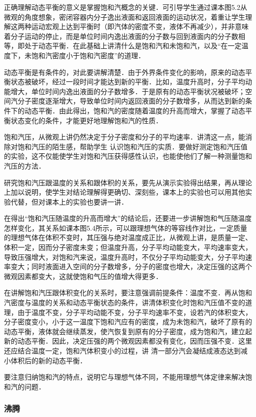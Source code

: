 正确理解动态平衡的意义是掌握饱和汽概念的关键．可引导学生通过课本图5.2从微观的角度想象，密闭容器内分子逸出液面和返回液面的运动状况，着重让学生理解这两种运动宏观上达到平衡时（即汽体的密度不变，液体不再减少），并非意味着分子运动的停止，而是单位时间内逸出液面的分子数与回到液面内的分子数相等，即处于动态平衡．在此基础上讲清什么是饱和汽和未饱和汽，以及“在一定温度下，未饱和汽密度小于饱和汽密度”的道理．

动态平衡是有条件的，对此要讲解清楚．由于外界条件变化的影响，原来的动态平衡状态被破坏，经过一段时间才能达到新的平衡．比如，温度升高时，分子平均动能增大，单位时间内逸出液面的分子数增多．于是原有的动态平衡状况被破坏；空间汽分子密度逐渐增大，导致单位时间内返回液面的分子数增多，从而达到新的条件下的动态平衡．由此得出，饱和汽的密度随着温度的升高而增大，掌握了动态平衡状态变化的条件，才能更好地理解饱和汽的性质．

饱和汽压，从微观上讲仍然决定于分子密度和分子的平均速率．讲清这一点，能消除对饱和汽压的陌生感，帮助学生
认识饱和汽压的实质．要做好测定饱和汽压值的实验，这不仅能使学生对饱和汽压获得感性认识，也能使他们了解一种测量饱和汽压的方法．

研究饱和汽压跟温度的关系和跟体积的关系，要先从演示实验得出结果，再从理论上加以说明，使学生对结论理解得更确切、深刻些，课本上的实验也可以用其他实验代替，但对课本上的实验也要讲一讲．

在得出“饱和汽压随温度的升高而增大”的结论后，还要进一步讲解饱和气压随温度怎样变化，其关系如课本图5.4所示，可以跟理想气体的等容线作对比，一定质量的理想气体在体积不变时，其压强与绝对温度成正比，从微观上讲，是质量一定、体积一定，因而分子密度未变；但温度升高，分子平均动能变大，平均速率变大，导致压强增大，对饱和汽来说，温度升高时，不仅分子平均动能变大，分子平均速率变大；同时液面进入空间的分子数增多，分子的密度也增大，决定压强的这两个微观因素都变大，这就使饱和气压的值增大得更多．

在讲解饱和汽压跟体积变化的关系时，要注意强调前提条件：温度不变．再从饱和汽密度与温度的关系和动态平衡状态的条件，讲清体积变化时饱和汽压值不变的道理，由于温度不变，分子平均动能不变，分子平均速率不变，设若汽的体积变大，分子密度变小，小于这一温度下饱和汽应有的密度，成为未饱和汽，破坏了原有的动态平衡，液体就会继续蒸发，使汽恢复到原有的分子密度，成为饱和汽，建立起新的动态平衡．因此，决定压强的两个微观因素都没有变化，因而压强不变．这里还应结合温度一定，饱和汽体积变小的过程，讲
清一部分汽会凝结成液态达到减小体积后的新的动态平衡．

要注意归纳饱和汽的特点，说明它与理想气体不同，不能用理想气体定律来解决饱和汽的问题．

\subsubsection{沸腾}

